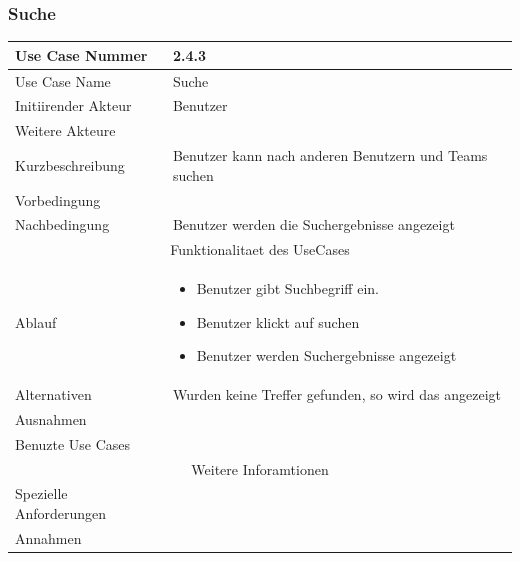 \documentclass[10pt,a4paper]{article}
\begin{document}
\subsubsection{Suche}
		\begin{tabular}{|l|p{.5\linewidth}|}
		\hline Use Case Nummer & 2.4.3 \\ 
		\hline Use Case Name & Suche \\ 
		\hline Initiirender Akteur & Benutzer \\
		\hline Weitere Akteure &  \\
		\hline Kurzbeschreibung & Benutzer kann nach anderen Benutzern und Teams suchen \\
		\hline Vorbedingung &  \\
		\hline Nachbedingung & Benutzer werden die Suchergebnisse angezeigt \\
		\hline \multicolumn{2}{|c|}{Funktionalitaet des UseCases}\\
		\hline Ablauf & \begin{itemize}
			\item Benutzer gibt Suchbegriff ein.
			\item Benutzer klickt auf suchen
			\item Benutzer werden Suchergebnisse angezeigt
		\end{itemize} \\
		\hline Alternativen & Wurden keine Treffer gefunden, so wird das angezeigt \\
		\hline Ausnahmen &  \\
		\hline Benuzte Use Cases &  \\
		\hline \multicolumn{2}{|c|}{Weitere Inforamtionen} \\
		\hline Spezielle Anforderungen &  \\
		\hline Annahmen &  \\
		\hline
		\end{tabular}
\end{document}
